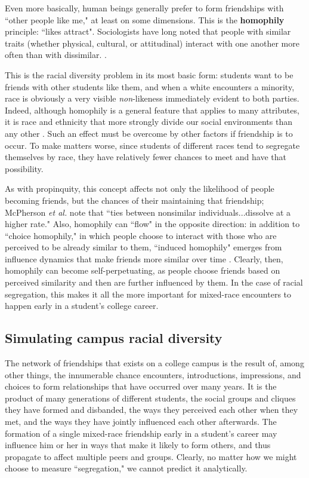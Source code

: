 Even more basically, human beings generally prefer to form friendships with
``other people like me," at least on some dimensions. This is the
\textbf{homophily} principle: ``likes attract". Sociologists have long noted
that people with similar traits (whether physical, cultural, or attitudinal)
interact with one another more often than with dissimilar. 
\cite{centola_homophily_2007}.

This is the racial diversity problem in its most basic form: students want to
be friends with other students like them, and when a white encounters a
minority, race is obviously a very visible \textit{non}-likeness immediately
evident to both parties. Indeed, although homophily is a general feature that
applies to many attributes, it is race and ethnicity that more strongly divide
our social environments than any other \cite{mcpherson_birds_2001}. Such an
effect must be overcome by other factors if friendship is to occur. To make
matters worse, since students of different races tend to segregate themselves
by race, they have relatively fewer chances to meet and have that possibility.

As with propinquity, this concept affects not only the likelihood of people
becoming friends, but the chances of their maintaining that friendship;
McPherson \textit{et al.} note that ``ties between nonsimilar
individuals...dissolve at a higher rate." \cite[p.415]{mcpherson_birds_2001}
Also, homophily can ``flow" in the opposite direction: in addition to ``choice
homophily," in which people choose to interact with those who are perceived to
be already similar to them, ``induced homophily" emerges from influence
dynamics that make friends more similar over time
\cite{mcpherson_homophily_1987}. Clearly, then, homophily can become
self-perpetuating, as people choose friends based on perceived similarity and
then are further influenced by them. In the case of racial segregation, this
makes it all the more important for mixed-race encounters to happen early in a
student's college career.


\subsection{Simulating campus racial diversity}

The network of friendships that exists on a college campus is the result of,
among other things, the innumerable chance encounters, introductions,
impressions, and choices to form relationships that have occurred over many
years. It is the product of many generations of different students, the social
groups and cliques they have formed and disbanded, the ways they perceived
each other when they met, and the ways they have jointly influenced each other
afterwards. The formation of a single mixed-race friendship early in a
student's career may influence him or her in ways that make it likely to form
others, and thus propagate to affect multiple peers and groups. Clearly, no
matter how we might choose to measure ``segregation," we cannot predict it
analytically.  

